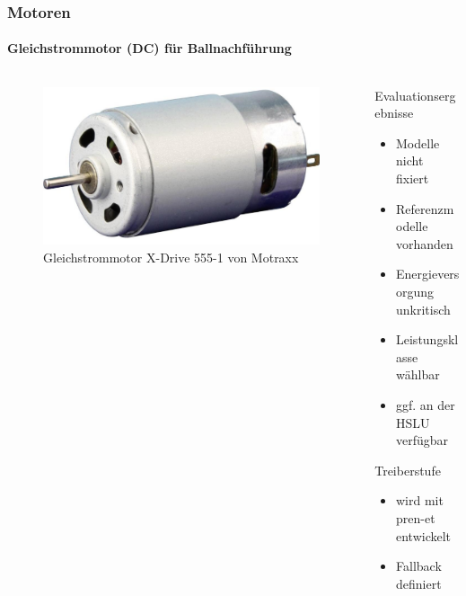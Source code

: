 \begin{frame}
	\frametitle{Motoren \hfill{} \footnotesize \group}
	\framesubtitle{Gleichstrommotor (DC) für Ballnachführung}
	\begin{columns}
		\begin{column}{0.5\textwidth}
			\begin{figure}
				\centering
				\includegraphics[width=1\textwidth]{../../fig/motor/dc_01.png}
				\caption{Gleichstrommotor X-Drive 555-1 von Motraxx}
			\end{figure}
		\end{column}
		\begin{column}{0.5\textwidth}
			\begin{block}{Evaluationsergebnisse}
				\begin{itemize}
					\item Modelle nicht fixiert
					\item Referenzmodelle vorhanden
					\item Energieversorgung unkritisch
					\item Leistungsklasse wählbar
					\item ggf. an der HSLU verfügbar
				\end{itemize}
			\end{block}
			\begin{exampleblock}{Treiberstufe}
				\begin{itemize}
					\item wird mit pren-et entwickelt
					\item Fallback definiert
				\end{itemize}
			\end{exampleblock}
		\end{column}
	\end{columns}
\end{frame}


